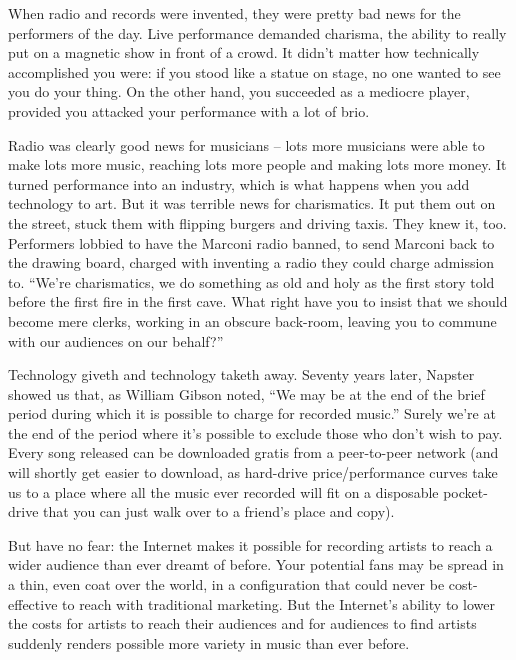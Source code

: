 When radio and records were invented, they were pretty bad news for
the performers of the day. Live performance demanded charisma, the
ability to really put on a magnetic show in front of a crowd. It
didn't matter how technically accomplished you were: if you stood
like a statue on stage, no one wanted to see you do your thing. On
the other hand, you succeeded as a mediocre player, provided you
attacked your performance with a lot of brio.

Radio was clearly good news for musicians -- lots more musicians
were able to make lots more music, reaching lots more people and
making lots more money. It turned performance into an industry,
which is what happens when you add technology to art. But it was
terrible news for charismatics. It put them out on the street,
stuck them with flipping burgers and driving taxis. They knew it,
too. Performers lobbied to have the Marconi radio banned, to send
Marconi back to the drawing board, charged with inventing a radio
they could charge admission to. ``We're charismatics, we do
something as old and holy as the first story told before the first
fire in the first cave. What right have you to insist that we
should become mere clerks, working in an obscure back-room, leaving
you to commune with our audiences on our behalf?''

Technology giveth and technology taketh away. Seventy years later,
Napster showed us that, as William Gibson noted, ``We may be at the
end of the brief period during which it is possible to charge for
recorded music.'' Surely we're at the end of the period where it's
possible to exclude those who don't wish to pay. Every song
released can be downloaded gratis from a peer-to-peer network (and
will shortly get easier to download, as hard-drive
price/performance curves take us to a place where all the music
ever recorded will fit on a disposable pocket-drive that you can
just walk over to a friend's place and copy).

But have no fear: the Internet makes it possible for recording
artists to reach a wider audience than ever dreamt of before. Your
potential fans may be spread in a thin, even coat over the world,
in a configuration that could never be cost-effective to reach with
traditional marketing. But the Internet's ability to lower the
costs for artists to reach their audiences and for audiences to
find artists suddenly renders possible more variety in music than
ever before.

